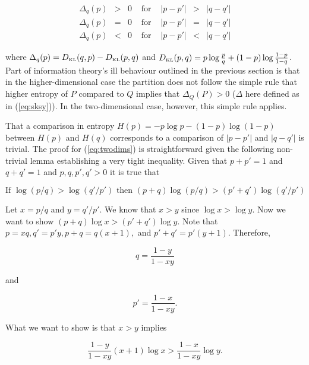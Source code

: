 \documentclass[11pt]{article}
\begin{document}
\begin{equation}
  \label{eq:twodims}
  \begin{array}{rclcrcl}
  \Delta_{q}(p)&>&0&\mbox{ for }&|p-p'|&>&|q-q'|\\
  \Delta_{q}(p)&=&0&\mbox{ for }&|p-p'|&=&|q-q'|\\
  \Delta_{q}(p)&<&0&\mbox{ for }&|p-p'|&<&|q-q'|
  \end{array}
\end{equation}

where
$\Delta_{q}(p)=D_{\mbox{\tiny KL}}(q,p)-D_{\mbox{\tiny KL}}(p,q)$ and
$D_{\mbox{\tiny KL}}(p,q)=p\log\frac{p}{q}+(1-p)\log\frac{1-p}{1-q}$.
Part of information theory's ill behaviour outlined in the previous
section is that in the higher-dimensional case the partition does not
follow the simple rule that higher entropy of $P$ compared to $Q$
implies that $\Delta_{Q}(P)>0$ ($\Delta$ here defined as in
(\ref{eq:sksy})). In the two-dimensional case, however, this simple
rule applies.

That a comparison in entropy $H(p)=-p\log{}p-(1-p)\log(1-p)$ between
$H(p)$ and $H(q)$ corresponds to a comparison of $|p-p'|$ and $|q-q'|$
is trivial. The proof for (\ref{eq:twodims}) is straightforward given
the following non-trivial lemma establishing a very tight inequality.
Given that $p+p'=1$ and $q+q'=1$ and $p,q,p',q'>0$ it is true
that

\begin{equation}
  \label{eq:lemma}
  \mbox{If }\log(p/q)>\log(q'/p')\mbox{ then }(p+q)\log(p/q)>(p'+q')\log(q'/p')
\end{equation}

Let $x=p/q$ and $y=q'/p'$. We know that $x>y$ since $\log{}x>\log{}y$.
Now we want to show $(p+q)\log{}x>(p'+q')\log{}y$. Note that
$p=xq,q'=p'y,p+q=q(x+1),$ and $p'+q'=p'(y+1)$. Therefore,

\begin{equation}
  \label{eq:thirteena}
  q=\frac{1-y}{1-xy}
\end{equation}

and

\begin{equation}
  \label{eq:thirteenb}
  p'=\frac{1-x}{1-xy}.
\end{equation}

What we want to show is that $x>y$ implies

\begin{equation}
  \label{eq:thirteenc}
  \frac{1-y}{1-xy}(x+1)\log{}x>\frac{1-x}{1-xy}\log{}y.
\end{equation}
\end{document}

